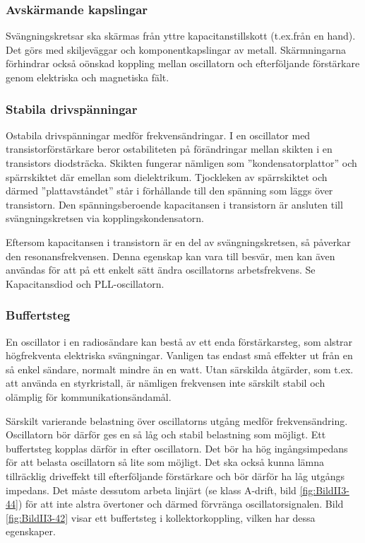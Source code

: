 \subsubsection{Avskärmande kapslingar}

Svängningskretsar ska skärmas från yttre kapacitanstillskott
(t.ex.från en hand).
Det görs med skiljeväggar och komponentkapslingar av metall.
Skärmningarna förhindrar också oönskad koppling mellan oscillatorn och
efterföljande förstärkare genom elektriska och magnetiska fält.

\subsubsection{Stabila drivspänningar}

Ostabila drivspänningar medför frekvensändringar.
I en oscillator med transistorförstärkare beror ostabiliteten på förändringar
mellan skikten i en transistors diodsträcka.
Skikten fungerar nämligen som ''kondensatorplattor'' och spärrskiktet där
emellan som dielektrikum.
Tjockleken av spärrskiktet och därmed ''plattavståndet'' står i förhållande
till den spänning som läggs över transistorn.
Den spänningsberoende kapacitansen i transistorn är ansluten till
svängningskretsen via kopplingskondensatorn.

Eftersom kapacitansen i transistorn är en del av svängningskretsen, så påverkar
den resonansfrekvensen.
Denna egenskap kan vara till besvär, men kan även användas för att på ett
enkelt sätt ändra oscillatorns arbetsfrekvens.
Se Kapacitansdiod och PLL-oscillatorn.

\subsubsection{Buffertsteg}

En oscillator i en radiosändare kan bestå av ett enda förstärkarsteg,
som alstrar högfrekventa elektriska svängningar.
Vanligen tas endast små effekter ut från en så enkel sändare, normalt mindre än
en watt.
Utan särskilda åtgärder, som t.ex. att använda en styrkristall, är nämligen
frekvensen inte särskilt stabil och olämplig för kommunikationsändamål.

Särskilt varierande belastning över oscillatorns utgång medför frekvensändring.
Oscillatorn bör därför ges en så låg och stabil belastning som möjligt.
Ett buffertsteg kopplas därför in efter oscillatorn.
Det bör ha hög ingångsimpedans för att belasta oscillatorn så lite som möjligt.
Det ska också kunna lämna tillräcklig driveffekt till efterföljande förstärkare
och bör därför ha låg utgångs impedans.
Det måste dessutom arbeta linjärt (se klass A-drift, bild \ref{fig:BildII3-44})
för att inte alstra övertoner och därmed förvränga oscillatorsignalen.
Bild \ref{fig:BildII3-42} visar ett buffertsteg i kollektorkoppling, vilken har
dessa egenskaper.

